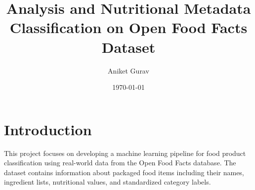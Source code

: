 \documentclass[11pt]{article}
\title{Analysis and Nutritional Metadata Classification on Open Food Facts Dataset}
\author{Aniket Gurav}
\date{\today}
\begin{document}
\maketitle

\tableofcontents
\newpage

\begin{comment}
\section{Introduction}
\section{Missing Value Analysis}
\section{Exploratory Data Analysis}
\section{Visual Exploration of Product Metadata}
\section{Nutritional Health Score Analysis}
\section{Food Category Tagging Pipeline}
\section{Nutritional Entity Classification Model}
\section{Model Evaluation and Discussion}
\section{Conclusion and Future Work}
\end{comment}
\newpage

\section{Introduction}

This project focuses on developing a machine learning pipeline for food product classification using real-world data from the Open Food Facts database. The dataset contains information about packaged food items including their names, ingredient lists, nutritional values, and standardized category labels.
\end{document}
